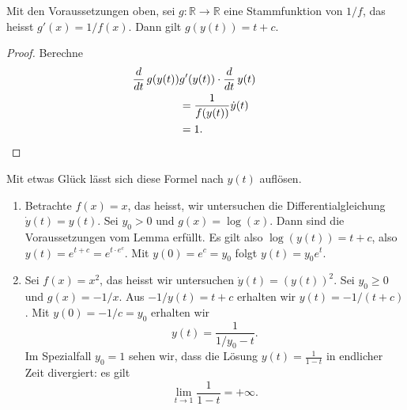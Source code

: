 \documentclass[../main.tex]{subfiles}
\begin{document}
\begin{lemma*}
  Mit den Voraussetzungen oben,
  sei $g \colon \mathbb{R} \to \mathbb{R}$ eine Stammfunktion
  von $1/f$, das heisst $g'(x) = 1/f(x)$.
  Dann gilt $g(y(t)) = t + c$.
\end{lemma*}

\begin{proof}
  Berechne
  \begin{align*}
    \frac{d}{dt} \, g(y(t))
    & g'(y(t)) \cdot \frac{d}{dt} \, y(t)\\
    &= \frac{1}{f(y(t))} \dot y(t) \\
    &= 1. && \qedhere
  \end{align*}
\end{proof}

Mit etwas Glück lässt sich diese Formel nach $y(t)$ auflösen.

\begin{examples}
  \leavevmode
  \begin{enumerate}[(1)]
    \item Betrachte $f(x) = x$, das heisst, wir untersuchen
      die Differentialgleichung $\dot y(t) = y(t)$.
      Sei $y_0 > 0$ und $g(x) = \log(x)$.
      Dann sind die Voraussetzungen vom Lemma erfüllt.
      Es gilt also $\log(y(t)) = t + c$, also
      $y(t) = e^{t + c} = e^{t \cdot e^c}$.
      Mit $y(0) = e^c = y_0$ folgt $y(t) = y_0 e^t$.
    \item Sei $f(x) = x^2$, das heisst
      wir untersuchen $\dot y(t) = {(y(t))}^2$.
      Sei $y_0 \geq 0$ und
      $g(x) = -1/x$.
      Aus $-1/y(t) = t + c$ erhalten wir
      $y(t) = -1/(t + c)$.
      Mit  $y(0) = -1/c = y_0$ erhalten wir
      \[
        y(t) = \frac{1}{1/y_0 - t}.
      \]
      Im Spezialfall $y_0 = 1$ sehen wir,
      dass die Lösung $y(t) = \frac{1}{1-t}$ 
      in endlicher Zeit divergiert: es gilt
      \[
        \lim_{t \to 1} \frac{1}{1-t} = +\infty.
      \]
  \end{enumerate}
\end{examples}
\end{document}
